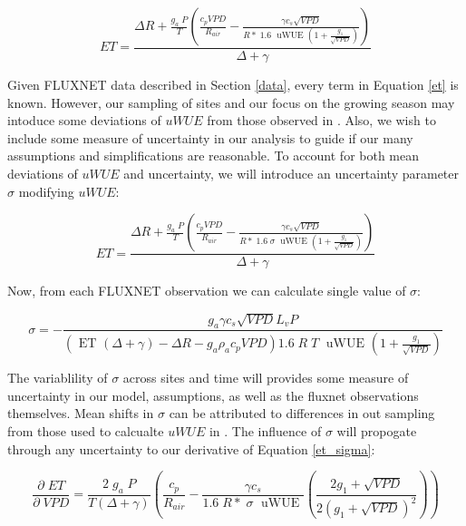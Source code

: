 \documentclass[draft,linenumbers]{agujournal}
\begin{document}
\begin{linenomath*}
  \begin{equation}
    ET = \frac{\Delta R + \frac{g_a\; P}{T} \left( \frac{ c_p VPD}{R_{air}} -  \frac{\gamma c_s \sqrt{VPD} }{ R* \; 1.6\; \text{ uWUE } (1 + \frac{g_1}{\sqrt{VPD}})} \right) }{ \Delta + \gamma}
    \label{et}
  \end{equation}
\end{linenomath*}

Given FLUXNET data described in Section \ref{data}, every term in Equation \ref{et} is known. However, our sampling of sites and our focus on the growing season may intoduce some deviations of $uWUE$ from those observed in \citet{Zhou_2015}. Also, we wish to include some measure of uncertainty in our analysis to guide if our many assumptions and simplifications are reasonable. To account for both mean deviations of $uWUE$ and uncertainty, we will introduce an uncertainty parameter $\sigma$ modifying $uWUE$:

\begin{linenomath*}
  \begin{equation}
    ET = \frac{\Delta R + \frac{g_a\; P}{T} \left( \frac{ c_p VPD}{R_{air}} -  \frac{\gamma c_s \sqrt{VPD} }{ R* \; 1.6\; \sigma \; \text{ uWUE } (1 + \frac{g_1}{\sqrt{VPD}})} \right) }{ \Delta + \gamma}
    \label{et_sigma}
  \end{equation}
\end{linenomath*}

Now, from each FLUXNET observation we can calculate single value of $\sigma$:

\begin{linenomath*}
  \begin{equation}
\sigma = - \frac{g_a \gamma c_s \sqrt{VPD} L_v P }{ \left(\text{ ET } ( \Delta + \gamma) - \Delta R - g_a \rho_a c_p VPD\right) 1.6 \; R\; T\; \text{ uWUE } (1 + \frac{g_1}{\sqrt{VPD}})}
    \label{et_sigma}
  \end{equation}
\end{linenomath*}

The variablility of $\sigma$ across sites and time will provides some measure of uncertainty in our model, assumptions, as well as the fluxnet observations themselves. Mean shifts in $\sigma$ can be attributed to differences in out sampling from those used to calcualte $uWUE$ in \citet{Zhou_2015}. The influence of $\sigma$ will propogate through any uncertainty to our derivative of Equation \ref{et_sigma}:

\begin{linenomath*}
  \begin{equation}
    \frac{\partial \;  ET}{\partial \; VPD} = \frac{2\; g_a \; P}{T(\Delta + \gamma)}   \left(\frac{ c_p}{R_{air}} -  \frac{\gamma c_s }{1.6 \; R*\; \sigma \; \text{ uWUE }} \left( \frac{2 g_1 + \sqrt{VPD}}{2 (g_1 + \sqrt{VPD})^2}\right) \right)
    \label{d_et}
  \end{equation}
\end{linenomath*}
\end{document}
